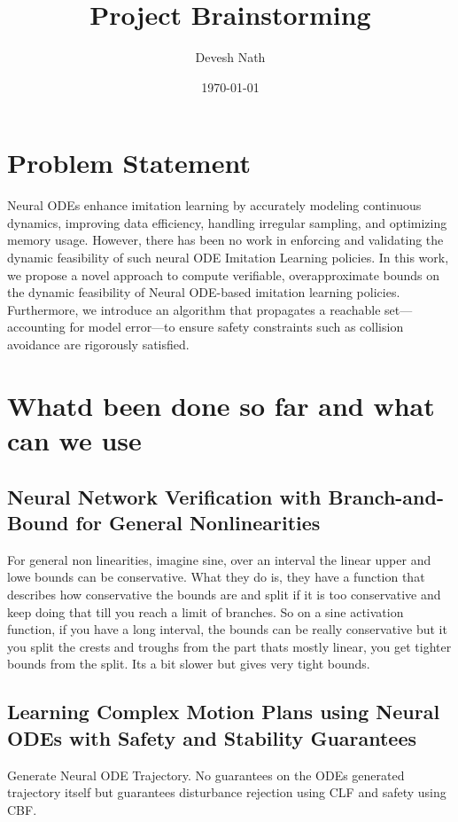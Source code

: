 \documentclass[12pt]{article}
\begin{document}
\title{Project Brainstorming}
\author{Devesh Nath}
\date{\today}

\maketitle

\section{Problem Statement}
Neural ODEs enhance imitation learning by accurately modeling continuous dynamics, improving data efficiency, handling irregular sampling, and optimizing memory usage. 
However, there has been no work in enforcing and validating the dynamic feasibility of such neural ODE Imitation Learning policies. In this work, we propose a novel approach to compute verifiable, overapproximate bounds on the dynamic feasibility of Neural ODE-based imitation learning policies. Furthermore, we introduce an algorithm that propagates a reachable set—accounting for model error—to ensure safety constraints such as collision avoidance are rigorously satisfied.


\section{Whatd been done so far and what can we use}
\subsection{Neural Network Verification with Branch-and-Bound for General Nonlinearities}
For general non linearities, imagine sine, over an interval the linear upper and lowe bounds can be conservative. What they do is, they have a function that describes how conservative the bounds are and split if it is too conservative and keep doing that till you reach a limit of branches. So on a sine activation function, if you have a long interval,
the bounds can be really conservative but it you split the crests and troughs from the part thats mostly linear, you get tighter bounds from the split. Its a bit slower but gives very tight bounds. 

\subsection{Learning Complex Motion Plans using Neural ODEs with Safety and Stability Guarantees}
Generate Neural ODE Trajectory. No guarantees on the ODEs generated trajectory itself but guarantees disturbance rejection using CLF and safety using CBF.
\end{document}
